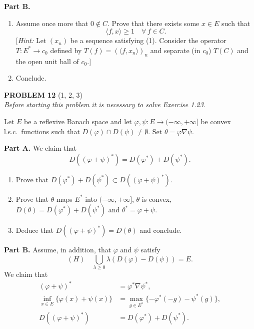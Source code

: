 \documentclass[12pt]{article}
\newcommand{\ip}[2]{\langle #1, #2 \rangle}
\begin{document}
\noindent\textbf{Part B.}

\begin{enumerate}
\item Assume once more that $0 \notin C$. Prove that there exists some $x \in E$ such that
\[
\ip{f}{x} \ge 1 \quad \forall\, f \in C.
\]
[\textit{Hint:} Let $(x_n)$ be a sequence satisfying (1). Consider the operator $T : E^* \to c_0$
defined by $T(f) = (\ip{f}{x_n})_n$ and separate (in $c_0$) $T(C)$ and the open unit ball of $c_0$.]

\item Conclude.
\end{enumerate}

\bigskip

\noindent\textbf{PROBLEM 12} (1, 2, 3)\\[4pt]
\textit{Before starting this problem it is necessary to solve Exercise 1.23.}

\medskip

Let $E$ be a reflexive Banach space and let $\varphi, \psi : E \to (-\infty,+\infty]$ be convex
l.s.c.\ functions such that $D(\varphi) \cap D(\psi) \neq \emptyset$. Set $\theta = \varphi \nabla \psi$.

\medskip

\noindent\textbf{Part A.} We claim that
\[
D((\varphi + \psi)^*) = D(\varphi^*) + D(\psi^*).
\]

\begin{enumerate}
\item Prove that $D(\varphi^*) + D(\psi^*) \subset D((\varphi+\psi)^*)$.

\item Prove that $\theta$ maps $E^*$ into $(-\infty,+\infty]$, $\theta$ is convex,
$D(\theta) = D(\varphi^*) + D(\psi^*)$ and $\theta^* = \varphi + \psi$.

\item Deduce that $D((\varphi+\psi)^*) = D(\theta)$ and conclude.
\end{enumerate}

\noindent\textbf{Part B.} Assume, in addition, that $\varphi$ and $\psi$ satisfy
\[
(H)\quad \bigcup_{\lambda \ge 0} \lambda(D(\varphi) - D(\psi)) = E.
\]
We claim that
\begin{align*}
(\varphi + \psi)^* &= \varphi^* \nabla \psi^*, \tag{i}\\
\inf_{x \in E}\{\varphi(x) + \psi(x)\} &= \max_{g \in E^*}\{-\varphi^*(-g) - \psi^*(g)\}, \tag{ii}\\
D((\varphi + \psi)^*) &= D(\varphi^*) + D(\psi^*). \tag{iii}
\end{align*}
\end{document}
